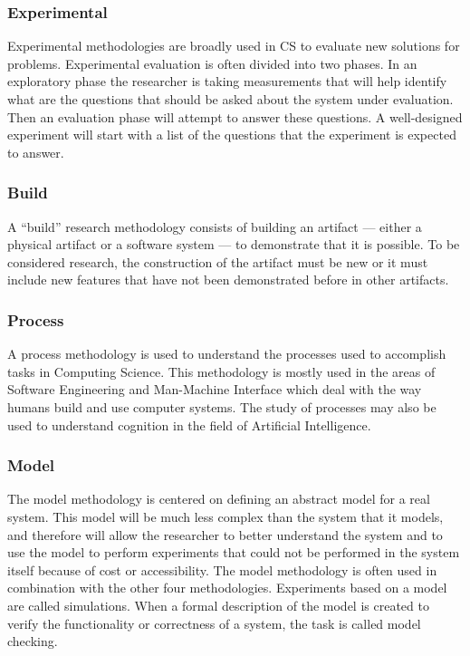 \subsubsection*{Experimental}

Experimental methodologies are broadly used in CS to evaluate new solutions for problems. Experimental evaluation is often divided into two phases. In an exploratory phase the researcher is taking measurements that will help identify what are the questions that should be asked about the system under evaluation. Then an evaluation phase will attempt to answer these questions. A well-designed experiment will start with a list of the questions that the experiment is expected to answer. \autocite{Amaral}

\subsubsection*{Build}

A ``build'' research methodology consists of building an artifact — either a physical artifact or a software system — to demonstrate that it is possible. To be considered research, the construction of the artifact must be new or it must include new features that have not been demonstrated before in other artifacts. \autocite{Amaral}

\subsubsection*{Process}

A process methodology is used to understand the processes used to accomplish tasks in Computing Science. This methodology is mostly used in the areas of Software Engineering and Man-Machine Interface which deal with the way humans build and use computer systems. The study of processes may also be used to understand cognition in the field of Artificial Intelligence. \autocite{Amaral}

\subsubsection*{Model}

The model methodology is centered on defining an abstract model for a real system. This model will be much less complex than the system that it models, and therefore will allow the researcher to better understand the system and to use the model to perform experiments that could not be performed in the system itself because of cost or accessibility. The model methodology is often used in combination with the other four methodologies. Experiments based on a model are called simulations. When a formal description of the model is created to verify the functionality or correctness of a system, the task is called model checking. \autocite{Amaral}

